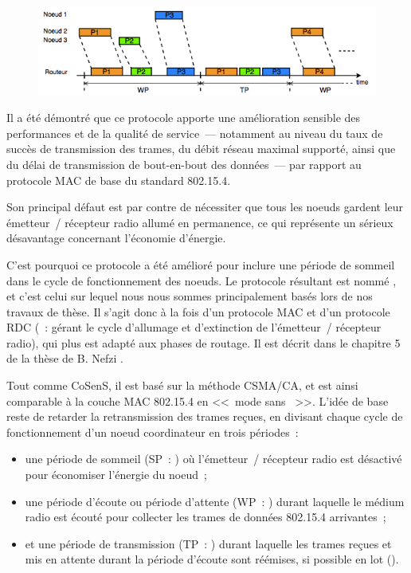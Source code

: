 \begin{figure}[!hbt]
\centering
\includegraphics[width=12.5cm]{images/ch3-cosens-base.png}
\label{FigCoSenSBase}
\end{figure}

Il a été démontré que ce protocole apporte une amélioration sensible
des performances et de la qualité de service~--- notamment au niveau
du taux de succès de transmission des trames, du débit réseau maximal
supporté, ainsi que du délai de transmission de bout-en-bout des données~---
par rapport au protocole MAC de base du standard 802.15.4.

\newpage

Son principal défaut est par contre de nécessiter que tous les noeuds
gardent leur émetteur~/ récepteur radio allumé en permanence, ce qui
représente un sérieux désavantage concernant l'économie d'énergie.

C'est pourquoi ce protocole a été amélioré pour inclure une période
de sommeil dans le cycle de fonctionnement des noeuds. Le protocole
résultant est nommé , et c'est celui sur lequel nous
nous sommes principalement basés lors de nos travaux de thèse. Il s'agit
donc à la fois d'un protocole MAC et d'un protocole RDC (~: gérant le cycle d'allumage et d'extinction de l'émetteur~/
récepteur radio), qui plus est adapté aux phases de routage. Il est décrit
dans le chapitre 5 de la thèse de B. Nefzi \cite{TheseBNefzi}.

Tout comme CoSenS, il est basé sur la méthode CSMA/CA, et est ainsi
comparable à la couche MAC 802.15.4 en <<~mode sans ~>>.
L'idée de base reste de retarder la retransmission des trames reçues,
en divisant chaque cycle de fonctionnement d'un noeud coordinateur
en trois périodes~:
\begin{itemize}
\item une période de sommeil (SP~: ) où l'émetteur~/
récepteur radio est désactivé pour économiser l'énergie du noeud~;
\item une période d'écoute ou période d'attente (WP~: )
durant laquelle le médium radio est écouté pour collecter les trames de
données 802.15.4 arrivantes~;
\item et une période de transmission (TP~: )
durant laquelle les trames reçues et mis en attente durant la période
d'écoute sont réémises, si possible en lot ().
\end{itemize}

